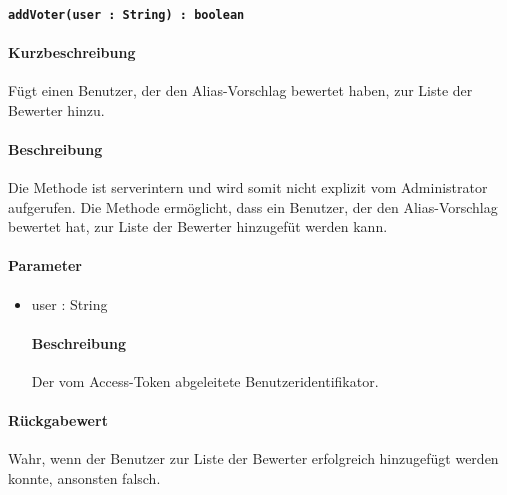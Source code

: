 \paragraph{\texttt{addVoter(user : String) : boolean}}%
\paragraph*{Kurzbeschreibung}
Fügt einen Benutzer, der den Alias-Vorschlag bewertet haben, zur Liste der Bewerter hinzu.
\paragraph*{Beschreibung}
Die Methode ist serverintern und wird somit nicht explizit vom Administrator aufgerufen.
Die Methode ermöglicht, dass ein Benutzer, der den Alias-Vorschlag bewertet hat, zur Liste der Bewerter hinzugefüt werden kann.
\paragraph*{Parameter}
\begin{itemize}
    \item user : String
    		\paragraph*{Beschreibung}
    		Der vom Access-Token abgeleitete Benutzeridentifikator.
\end{itemize}
\paragraph*{Rückgabewert}
Wahr, wenn der Benutzer zur Liste der Bewerter erfolgreich hinzugefügt werden konnte, ansonsten falsch.
